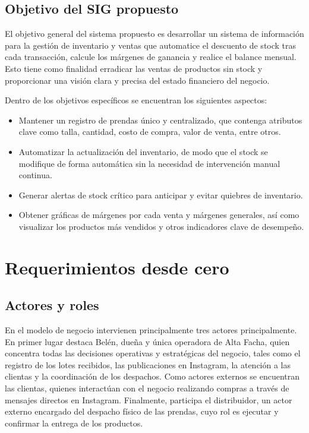 \documentclass[11pt,letterpaper]{article}
\begin{document}
\subsection*{Objetivo del SIG propuesto}
El objetivo general del sistema propuesto es desarrollar un sistema de información para la gestión de inventario y ventas que automatice el descuento de stock tras cada transacción, calcule los márgenes de ganancia y realice el balance mensual. Esto tiene como finalidad erradicar las ventas de productos sin stock y proporcionar una visión clara y precisa del estado financiero del negocio.

Dentro de los objetivos específicos se encuentran los siguientes aspectos:

\begin{itemize}
    \item Mantener un registro de prendas único y centralizado, que contenga atributos clave como talla, cantidad, costo de compra, valor de venta, entre otros.
    \item Automatizar la actualización del inventario, de modo que el stock se modifique de forma automática sin la necesidad de intervención manual continua.
    \item Generar alertas de stock crítico para anticipar y evitar quiebres de inventario.
    \item Obtener gráficas de márgenes por cada venta y márgenes generales, así como visualizar los productos más vendidos y otros indicadores clave de desempeño.
\end{itemize}
 

\section{Requerimientos desde cero}
\subsection*{Actores y roles}

En el modelo de negocio intervienen principalmente tres actores principalmente. En primer lugar destaca Belén, dueña y única operadora de Alta Facha, quien concentra todas las decisiones operativas y estratégicas del negocio, tales como el registro de los lotes recibidos, las publicaciones en Instagram, la atención a las clientas y la coordinación de los despachos. Como actores externos se encuentran las clientas, quienes interactúan con el negocio realizando compras a través de mensajes directos en Instagram. Finalmente, participa el distribuidor, un actor externo encargado del despacho físico de las prendas, cuyo rol es ejecutar y confirmar la entrega de los productos.
\end{document}
